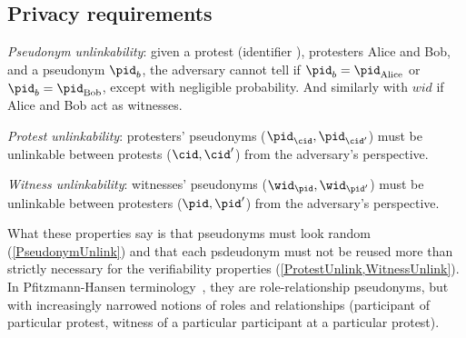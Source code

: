 \subsection{Privacy requirements}%
\label{privacy-properties}


\begin{requirements}[P]
\item\label{PseudonymUnlink} \emph{Pseudonym unlinkability}: given a protest 
  (identifier \cid), protesters Alice and Bob, and a pseudonym \(\pid_b\), the 
  adversary cannot tell if \(\pid_b = \pid_{\text{Alice}}\) or \(\pid_b = 
    \pid_{\text{Bob}}\), except with negligible probability. And similarly with $wid$ if Alice and Bob act as witnesses.
\item\label{ProtestUnlink} \emph{Protest unlinkability}: protesters' pseudonyms 
  (\(\pid_\cid, \pid_{\cid'}\)) must be unlinkable between protests (\(\cid, 
    \cid'\)) from the adversary's perspective.
\item\label{WitnessUnlink}\emph{Witness unlinkability}:  witnesses' pseudonyms 
  (\(\wid_\pid, \wid_{\pid'}\)) must be unlinkable between protesters (\(\pid, 
    \pid'\)) from the adversary's perspective.
\end{requirements}

What these properties say is that pseudonyms must look random 
(\cref{PseudonymUnlink}) and that each psdeudonym must not be reused
more than strictly necessary for the verifiability properties 
(\cref{ProtestUnlink,WitnessUnlink}). In Pfitzmann-Hansen
terminology~\cite{pfitzmann-hansen}, they are role-relationship
pseudonyms, but with increasingly narrowed notions of roles and
relationships (participant of particular protest, witness of a
particular participant at a particular protest).
